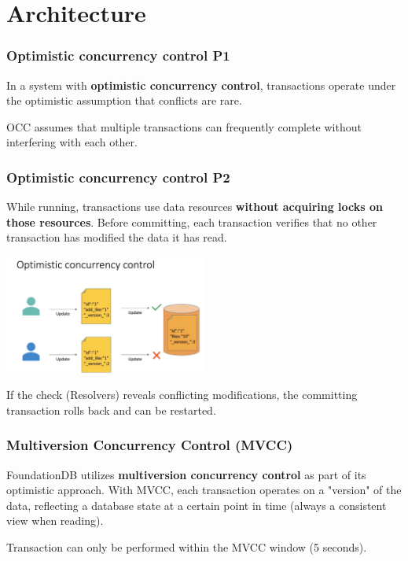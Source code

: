 \section{Architecture}

\begin{frame}
	\frametitle{Optimistic concurrency control P1}
 In a system with \textbf{optimistic concurrency control}, transactions operate under the optimistic assumption that conflicts are rare. 
\vspace{0.5cm}

 OCC assumes that multiple transactions can frequently complete without interfering with each other.
\end{frame}

\begin{frame}
	\frametitle{Optimistic concurrency control P2}
While running, transactions use data resources \textbf{without acquiring locks on those resources}. Before committing, each transaction verifies that no other transaction has modified the data it has read. 
\vspace{0.2cm}

\begin{center}
    \includegraphics[width=0.5\textwidth]{img/2-Architecture/Optimistic Concurrency Control.png}
\end{center}

If the check (Resolvers) reveals conflicting modifications, the committing transaction rolls back and can be restarted.


\end{frame}

\begin{frame}
	\frametitle{Multiversion Concurrency Control (MVCC)}
  FoundationDB utilizes \textbf{multiversion concurrency control} as part of its optimistic approach. With MVCC, each transaction operates on a "version" of the data, reflecting a database state at a certain point in time (always a consistent view when reading).
  \vspace{0.5cm}
  
  Transaction can only be performed within the MVCC window (5 seconds).
\end{frame}


